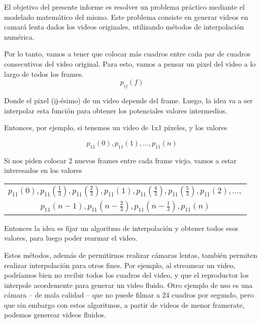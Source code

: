 El objetivo del presente informe es resolver un problema práctico mediante el modelado matemático del mismo. Este problema consiste en generar videos en camará lenta dados los videos originales, utilizando métodos de interpolación numérica.

Por lo tanto, vamos a tener que colocar más cuadros entre cada par de cuadros consecutivos del video original. Para esto, vamos a pensar un pixel del video a lo largo de todos los frames.
\[p_{ij}(f)\]

Donde el pixel (ij-ésimo) de un video depende del frame. Luego, la idea va a ser interpolar esta función para obtener los potenciales valores intermedios. 

Entonces, por ejemplo, si tenemos un video de 1x1 píxeles, y los valores

\[ p_{11}(0), p_{11}(1), ..., p_{11}(n)\]

Si nos piden colocar 2 nuevos frames entre cada frame viejo, vamos a estar interesados en los valores

\begin{center}
\begin{tabular}{c}
$p_{11}\left(0\right), p_{11}\left(\frac13\right), p_{11}\left(\frac23\right), p_{11}\left(1\right), p_{11}\left(\frac43\right), p_{11}\left(\frac53\right), p_{11}\left(2\right), ...,$ \\
$p_{11}\left(n-1\right), p_{11}\left(n- \frac23\right), p_{11}\left(n- \frac13\right), p_{11}\left(n\right)$ \\
\end{tabular}
\end{center}

Entonces la idea es fijar un algoritmo de interpolación y obtener todos esos valores, para luego poder rearmar el video.

Estos métodos, además de permitirnos realizar cámaras lentas, también permiten realizar interpolación para otros fines.
Por ejemplo, al streamear un video, podríamos bien no recibir todos los cuadros del video, y que el reproductor los interpole acordemente para generar un video fluido. Otro ejemplo de uso es una cámara -- de mala calidad -- que no puede filmar a 24 cuadros por segundo, pero que sin embargo con estos algoritmos, a partir de videos de menor framerate, podemos generear videos fluidos.

